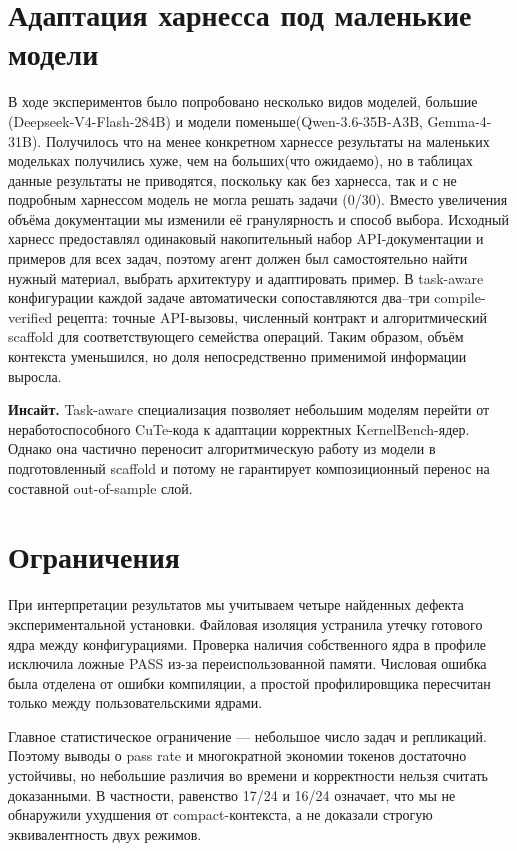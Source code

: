 \documentclass[10pt,a4paper]{article}
\newcommand{\insight}[1]{\par\smallskip\noindent\textbf{Инсайт.} #1\par\smallskip}
\begin{document}
\section{Адаптация харнесса под маленькие модели}

В ходе экспериментов было попробовано несколько видов моделей, большие (Deepseek-V4-Flash-284B) и модели поменьше(Qwen-3.6-35B-A3B, Gemma-4-31B). Получилось что на менее конкретном харнессе результаты на маленьких модельках получились хуже, чем на больших(что ожидаемо), но в таблицах данные результаты не приводятся, поскольку как без харнесса, так и с не подробным харнессом модель не могла решать задачи (0/30). Вместо увеличения объёма документации мы изменили её гранулярность и
способ выбора. Исходный харнесс предоставлял одинаковый накопительный
набор API-документации и примеров для всех задач, поэтому агент должен
был самостоятельно найти нужный материал, выбрать архитектуру и
адаптировать пример. В task-aware конфигурации каждой задаче
автоматически сопоставляются два--три compile-verified рецепта:
точные API-вызовы, численный контракт и алгоритмический scaffold для
соответствующего семейства операций. Таким образом, объём контекста
уменьшился, но доля непосредственно применимой информации выросла.

\insight{Task-aware специализация позволяет небольшим моделям перейти
от неработоспособного CuTe-кода к адаптации корректных KernelBench-ядер.
Однако она частично переносит алгоритмическую работу из модели в
подготовленный scaffold и потому не гарантирует композиционный перенос
на составной out-of-sample слой.}


\section{Ограничения}

При интерпретации результатов мы учитываем четыре найденных дефекта
экспериментальной установки. Файловая изоляция устранила утечку готового ядра
между конфигурациями. Проверка наличия собственного ядра в профиле исключила
ложные PASS из-за переиспользованной памяти. Числовая ошибка была отделена от
ошибки компиляции, а простой профилировщика пересчитан только между
пользовательскими ядрами.

Главное статистическое ограничение --- небольшое число задач и репликаций.
Поэтому выводы о pass rate и многократной экономии токенов достаточно устойчивы,
но небольшие различия во времени и корректности нельзя считать доказанными.
В частности, равенство 17/24 и 16/24 означает, что мы не обнаружили ухудшения
от compact-контекста, а не доказали строгую эквивалентность двух режимов.
\end{document}
